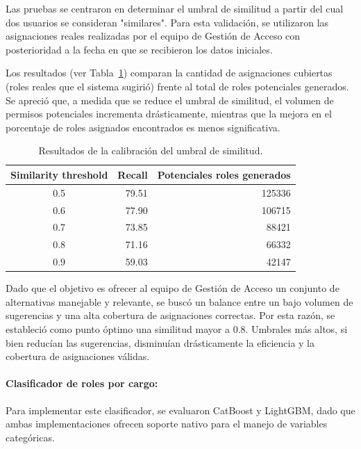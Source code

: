\documentclass[11pt,letterpaper]{article}
\begin{document}
\begin{itemize}
Las pruebas se centraron en determinar el umbral de similitud a partir
del cual dos usuarios se consideran "similares". Para esta validación,
se utilizaron las asignaciones reales realizadas por el equipo de
Gestión de Acceso con posterioridad a la fecha en que se recibieron los
datos iniciales.

Los resultados (ver Tabla~\ref{tab:sim_thresholds}) comparan la cantidad de asignaciones
cubiertas (roles reales que el sistema sugirió) frente al total de roles
potenciales generados. Se apreció que, a medida que se reduce el umbral
de similitud, el volumen de permisos potenciales incrementa
drásticamente, mientras que la mejora en el porcentaje de roles
asignados encontrados es menos significativa.

\begin{table}[h!]
    \centering
    \caption{Resultados de la calibración del umbral de similitud.}
    \label{tab:sim_thresholds}
    \begin{tabular}{@{}crr@{}}
        \toprule
        Similarity threshold & Recall & Potenciales roles generados \\
        \midrule
        0.5 & 79.51 & 125336 \\
        0.6 & 77.90 & 106715 \\
        0.7 & 73.85 & 88421 \\
        0.8 & 71.16 & 66332 \\
        0.9 & 59.03 & 42147 \\
        \bottomrule
    \end{tabular}
\end{table}

Dado que el objetivo es ofrecer al equipo de Gestión de Acceso un
conjunto de alternativas manejable y relevante, se buscó un balance
entre un bajo volumen de sugerencias y una alta cobertura de
asignaciones correctas. Por esta razón, se estableció como punto óptimo
una similitud mayor a 0.8. Umbrales más altos, si bien reducían las
sugerencias, disminuían drásticamente la eficiencia y la cobertura de
asignaciones válidas.

\hypertarget{clasificador-de-roles-por-cargo}{%
\paragraph{Clasificador de roles por
cargo:}\label{clasificador-de-roles-por-cargo}}

Para implementar este clasificador, se evaluaron CatBoost y LightGBM,
dado que ambas implementaciones ofrecen soporte nativo para el manejo de
variables categóricas.


\end{itemize}
\end{document}
